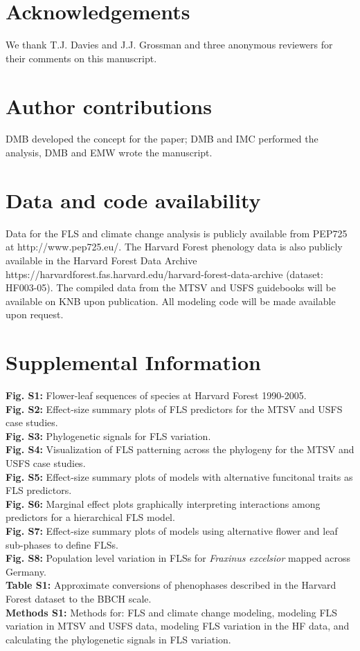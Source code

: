 \documentclass[11pt]{article}
\begin{document}
{\section*{Acknowledgements}
\noindent We thank T.J. Davies and J.J. Grossman and three anonymous reviewers for their comments on this manuscript.

\section*{Author contributions}
DMB developed the concept for the paper; DMB and IMC performed the analysis, DMB and EMW wrote the manuscript.

\section*{Data and code availability}
Data for the FLS and climate change analysis is publicly available from PEP725 at http://www.pep725.eu/. The Harvard Forest phenology data is also publicly available in the Harvard Forest Data Archive https://harvardforest.fas.harvard.edu/harvard-forest-data-archive (dataset: HF003-05). The compiled data from the MTSV and USFS guidebooks will be available on KNB upon publication. All modeling code will be made available upon request. %





\newpage
\section*{Supplemental Information}
\textbf{Fig. S1:} Flower-leaf sequences of species at Harvard Forest 1990-2005.\\
\textbf{Fig. S2:} Effect-size summary plots of FLS predictors for the MTSV and USFS case studies. \\
\textbf{Fig. S3:} Phylogenetic signals for FLS variation.\\
\textbf{Fig. S4:} Visualization of FLS patterning across the phylogeny for the MTSV and USFS case studies.\\
\textbf{Fig. S5:} Effect-size summary plots of models with alternative funcitonal traits as FLS predictors.\\
\textbf{Fig. S6:} Marginal effect plots graphically interpreting interactions among predictors for a hierarchical FLS model.\\
\textbf{Fig. S7:} Effect-size summary plots of models using alternative flower and leaf sub-phases to define FLSs.\\
\textbf{Fig. S8:} Population level variation in FLSs for \emph{Fraxinus excelsior} mapped across Germany.\\
\textbf{Table S1:} Approximate conversions of phenophases described in the Harvard Forest dataset to the BBCH scale.\\
\textbf{Methods S1:} Methods for: FLS and climate change modeling, modeling FLS variation in MTSV and USFS data, modeling FLS variation in the HF data, and calculating the phylogenetic signals in FLS variation.
\newpage
}
\end{document}
